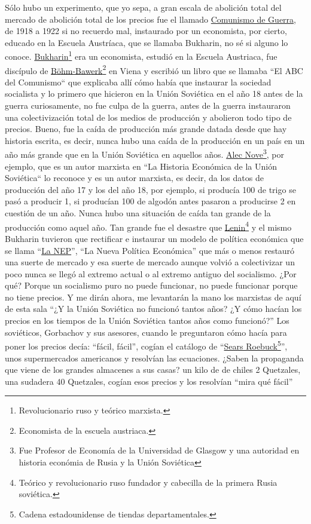 Sólo hubo un experimento, que yo sepa, a gran escala de abolición total del mercado de abolición total de los precios fue el llamado \href{https://en.wikipedia.org/wiki/War_communism}{Comunismo de Guerra}, de 1918 a 1922 si no recuerdo mal, instaurado por un economista, por cierto, educado en la Escuela Austríaca, que se llamaba Bukharin, no sé si alguno lo conoce. \href{https://en.wikipedia.org/wiki/Nikolai_Bukharin}{Bukharin}\footnote{Revolucionario ruso y teórico marxista.} era un economista, estudió en la Escuela Austriaca, fue discípulo de \href{https://en.wikipedia.org/wiki/Eugen_von_B%C3%B6hm-Bawerk}{Böhm-Bawerk}\footnote{Economista de la escuela austriaca.} en Viena y escribió un libro que se llamaba ``El ABC del Comunismo``\cite{bukharin1920abc} que explicaba allí cómo había que instaurar la sociedad socialista y lo primero que hicieron en la Unión Soviética en el año 18 antes de la guerra curiosamente, no fue culpa de la guerra, antes de la guerra instauraron una colectivización total de los medios de producción y abolieron todo tipo de precios. Bueno, fue la caída de producción más grande datada desde que hay historia escrita, es decir, nunca hubo una caída de la producción en un país en un año más grande que en la Unión Soviética en aquellos años. \href{https://en.wikipedia.org/wiki/Alexander_Nove}{Alec Nove}\footnote{Fue Profesor de Economía de la Universidad de Glasgow y una autoridad en historia económia de Rusia y la Unión Soviética}, por ejemplo, que es un autor marxista en ``La Historia Económica de la Unión Soviética``\cite{nove1992economic} lo reconoce y es un autor marxista, es decir, da los datos de producción del año 17 y los del año 18, por ejemplo, si producía 100 de trigo se pasó a producir 1, si producían 100 de algodón antes pasaron a producirse 2 en cuestión de un año. Nunca hubo una situación de caída tan grande de la producción como aquel año. Tan grande fue el desastre que \href{https://en.wikipedia.org/wiki/Vladimir_Lenin}{Lenin}\footnote{Teórico y revolucionario ruso fundador y cabecilla de la primera Rusia soviética.} y el mismo Bukharin tuvieron que rectificar e instaurar un modelo de política económica que se llama \enquote{\href{https://en.wikipedia.org/wiki/New_Economic_Policy}{La NEP}}, \enquote{La Nueva Política Económica} que más o menos restauró una suerte de mercado y esa suerte de mercado aunque volvió a colectivizar un poco nunca se llegó al extremo actual o al extremo antiguo del socialismo. ¿Por qué? Porque un socialismo puro no puede funcionar, no puede funcionar porque no tiene precios. Y me dirán ahora, me levantarán la mano los marxistas de aquí de esta sala \enquote{¿Y la Unión Soviética no funcionó tantos años? ¿Y cómo hacían los precios en los tiempos de la Unión Soviética tantos años como funcionó?} Los soviéticos, Gorbachov y sus asesores, cuando le preguntaron cómo hacía para poner los precios decía: \enquote{fácil, fácil}, cogían el catálogo de \enquote{\href{https://en.wikipedia.org/wiki/Sears}{Sears Roebuck}\footnote{Cadena estadounidense de tiendas departamentales.}}, unos supermercados americanos y resolvían las ecuaciones. ¿Saben la propaganda que viene de los grandes almacenes a sus casas? un kilo de de chiles 2 Quetzales, una sudadera 40 Quetzales, cogían esos precios y los resolvían \enquote{mira qué fácil} 